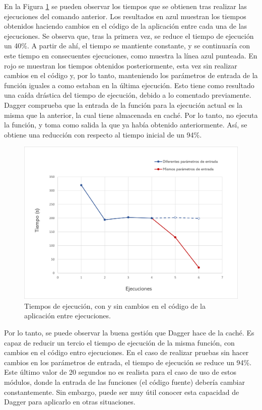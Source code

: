 En la Figura \ref{fig:times} se pueden observar los tiempos que se obtienen tras realizar las ejecuciones del comando anterior. Los resultados en azul muestran los tiempos obtenidos haciendo cambios en el código de la aplicación entre cada una de las ejecuciones. Se observa que, tras la primera vez, se reduce el tiempo de ejecución un 40\%. A partir de ahí, el tiempo se mantiente constante, y se continuaría con este tiempo en consecuentes ejecuciones, como muestra la línea azul punteada. En rojo se muestran los tiempos obtenidos posteriormente, esta vez sin realizar cambios en el código y, por lo tanto, manteniendo los parámetros de entrada de la función iguales a como estaban en la última ejecución. Esto tiene como resultado una caída drástica del tiempo de ejecución, debido a lo comentado previamente. Dagger comprueba que la entrada de la función para la ejecución actual es la misma que la anterior, la cual tiene almacenada en caché. Por lo tanto, no ejecuta la función, y toma como salida la que ya había obtenido anteriormente. Así, se obtiene una reducción con respecto al tiempo inicial de un 94\%.

\begin{figure}[t]
  \centerline{\includegraphics[width=13cm]{figuras/graph-times}}
  \caption{Tiempos de ejecución, con y sin cambios en el código de la aplicación entre ejecuciones.}
  \label{fig:times}
\end{figure}

Por lo tanto, se puede observar la buena gestión que Dagger hace de la caché. Es capaz de reducir un tercio el tiempo de ejecución de la misma función, con cambios en el código entro ejecuciones. En el caso de realizar pruebas sin hacer cambios en los parámetros de entrada, el tiempo de ejecución se reduce un 94\%. Este último valor de 20 segundos no es realista para el caso de uso de estos módulos, donde la entrada de las funciones (el código fuente) debería cambiar constantemente. Sin embargo, puede ser muy útil conocer esta capacidad de Dagger para aplicarlo en otras situaciones.

